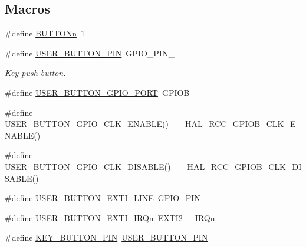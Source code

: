 \subsection*{Macros}
\begin{DoxyCompactItemize}
\item 
\#define \hyperlink{group__B-L072Z-LRWAN1__LOW__LEVEL__BUTTON_ga43d47e509ada64329393005c3be15d64}{B\+U\+T\+T\+O\+Nn}~1
\item 
\#define \hyperlink{group__B-L072Z-LRWAN1__LOW__LEVEL__BUTTON_ga34df6915e3013d6a0c74131d3946b659}{U\+S\+E\+R\+\_\+\+B\+U\+T\+T\+O\+N\+\_\+\+P\+IN}~G\+P\+I\+O\+\_\+\+P\+I\+N\+\_
\begin{DoxyCompactList}\small\item\em Key push-\/button. \end{DoxyCompactList}\item 
\#define \hyperlink{group__B-L072Z-LRWAN1__LOW__LEVEL__BUTTON_gae2e6fc2fdfda22b4eed3667375a8bd81}{U\+S\+E\+R\+\_\+\+B\+U\+T\+T\+O\+N\+\_\+\+G\+P\+I\+O\+\_\+\+P\+O\+RT}~G\+P\+I\+OB
\item 
\#define \hyperlink{group__B-L072Z-LRWAN1__LOW__LEVEL__BUTTON_gaa1f35ca26b42710d057661b54ace7d82}{U\+S\+E\+R\+\_\+\+B\+U\+T\+T\+O\+N\+\_\+\+G\+P\+I\+O\+\_\+\+C\+L\+K\+\_\+\+E\+N\+A\+B\+LE}()~\+\_\+\+\_\+\+H\+A\+L\+\_\+\+R\+C\+C\+\_\+\+G\+P\+I\+O\+B\+\_\+\+C\+L\+K\+\_\+\+E\+N\+A\+B\+LE()
\item 
\#define \hyperlink{group__B-L072Z-LRWAN1__LOW__LEVEL__BUTTON_ga71af1d1eec8f8b424b72f625abaad282}{U\+S\+E\+R\+\_\+\+B\+U\+T\+T\+O\+N\+\_\+\+G\+P\+I\+O\+\_\+\+C\+L\+K\+\_\+\+D\+I\+S\+A\+B\+LE}()~\+\_\+\+\_\+\+H\+A\+L\+\_\+\+R\+C\+C\+\_\+\+G\+P\+I\+O\+B\+\_\+\+C\+L\+K\+\_\+\+D\+I\+S\+A\+B\+LE()
\item 
\#define \hyperlink{group__B-L072Z-LRWAN1__LOW__LEVEL__BUTTON_gac41d04c2244ba780e4749991c85d1e9a}{U\+S\+E\+R\+\_\+\+B\+U\+T\+T\+O\+N\+\_\+\+E\+X\+T\+I\+\_\+\+L\+I\+NE}~G\+P\+I\+O\+\_\+\+P\+I\+N\+\_
\item 
\#define \hyperlink{group__B-L072Z-LRWAN1__LOW__LEVEL__BUTTON_ga2e6e65a053529869d1c370610825d98f}{U\+S\+E\+R\+\_\+\+B\+U\+T\+T\+O\+N\+\_\+\+E\+X\+T\+I\+\_\+\+I\+R\+Qn}~E\+X\+T\+I2\+\_\+\_\+\+I\+R\+Qn
\item 
\#define \hyperlink{group__B-L072Z-LRWAN1__LOW__LEVEL__BUTTON_ga5c260a4b4e26836dc3a9b6f15d317421}{K\+E\+Y\+\_\+\+B\+U\+T\+T\+O\+N\+\_\+\+P\+IN}~\hyperlink{group__B-L072Z-LRWAN1__LOW__LEVEL__BUTTON_ga34df6915e3013d6a0c74131d3946b659}{U\+S\+E\+R\+\_\+\+B\+U\+T\+T\+O\+N\+\_\+\+P\+IN}
\item 

\end{DoxyCompactItemize}
